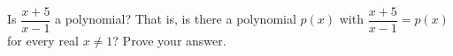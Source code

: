 Is $\dfrac{x+5}{x-1}$ a polynomial? That is, is there a polynomial $p(x)$ with $\dfrac{x+5}{x-1}=p(x)$ for every real $x\ne1$? Prove your answer.
